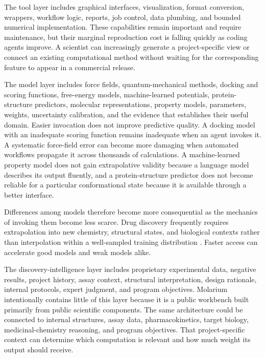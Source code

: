 \documentclass[11pt]{article}
\begin{document}
The tool layer includes graphical interfaces, visualization, format conversion, wrappers, workflow logic, reports, job control, data plumbing, and bounded numerical implementation. These capabilities remain important and require maintenance, but their marginal reproduction cost is falling quickly as coding agents improve. A scientist can increasingly generate a project-specific view or connect an existing computational method without waiting for the corresponding feature to appear in a commercial release.

The model layer includes force fields, quantum-mechanical methods, docking and scoring functions, free-energy models, machine-learned potentials, protein-structure predictors, molecular representations, property models, parameters, weights, uncertainty calibration, and the evidence that establishes their useful domain. Easier invocation does not improve predictive quality. A docking model with an inadequate scoring function remains inadequate when an agent invokes it. A systematic force-field error can become more damaging when automated workflows propagate it across thousands of calculations. A machine-learned property model does not gain extrapolative validity because a language model describes its output fluently, and a protein-structure predictor does not become reliable for a particular conformational state because it is available through a better interface.

Differences among models therefore become more consequential as the mechanics of invoking them become less scarce. Drug discovery frequently requires extrapolation into new chemistry, structural states, and biological contexts rather than interpolation within a well-sampled training distribution \citep{bender2021realistic1,bender2021realistic2,wigh2022representations}. Faster access can accelerate good models and weak models alike.

The discovery-intelligence layer includes proprietary experimental data, negative results, project history, assay context, structural interpretation, design rationale, internal protocols, expert judgment, and program objectives. Molarium intentionally contains little of this layer because it is a public workbench built primarily from public scientific components. The same architecture could be connected to internal structures, assay data, pharmacokinetics, target biology, medicinal-chemistry reasoning, and program objectives. That project-specific context can determine which computation is relevant and how much weight its output should receive.
\end{document}
